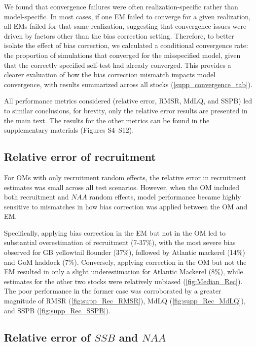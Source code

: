 \documentclass[
  12pt,
]{article}
\begin{document}
We found that convergence failures were often realization-specific
rather than model-specific. In most cases, if one EM failed to converge
for a given realization, all EMs failed for that same realization,
suggesting that convergence issues were driven by factors other than the
bias correction setting. Therefore, to better isolate the effect of bias
correction, we calculated a conditional convergence rate: the proportion
of simulations that converged for the misspecified model, given that the
correctly specified self-test had already converged. This provides a
clearer evaluation of how the bias correction mismatch impacts model
convergence, with results summarized across all stocks
(\autoref{supp_convergence_tab}).

All performance metrics considered (relative error, RMSR, MdLQ, and
SSPB) led to similar conclusions, for brevity, only the relative error
results are presented in the main text. The results for the other
metrics can be found in the supplementary materials (Figures S4--S12).

\hypertarget{relative-error-of-recruitment}{%
\subsection{Relative error of
recruitment}\label{relative-error-of-recruitment}}

For OMs with only recruitment random effects, the relative error in
recruitment estimates was small across all test scenarios. However, when
the OM included both recruitment and \(NAA\) random effects, model
performance became highly sensitive to mismatches in how bias correction
was applied between the OM and EM.

Specifically, applying bias correction in the EM but not in the OM led
to substantial overestimation of recruitment (7-37\%), with the most
severe bias observed for GB yellowtail flounder (37\%), followed by
Atlantic mackerel (14\%) and GoM haddock (7\%). Conversely, applying
correction in the OM but not the EM resulted in only a slight
underestimation for Atlantic Mackerel (8\%), while estimates for the
other two stocks were relatively unbiased (\autoref{fig:Median_Rec}).
The poor performance in the former case was corroborated by a greater
magnitude of RMSR (\autoref{fig:supp_Rec_RMSR}), MdLQ
(\autoref{fig:supp_Rec_MdLQ}), and SSPB (\autoref{fig:supp_Rec_SSPB}).

\hypertarget{relative-error-of-ssb-and-naa}{%
\subsection{\texorpdfstring{Relative error of \(SSB\) and
\(NAA\)}{Relative error of SSB and NAA}}\label{relative-error-of-ssb-and-naa}}
\end{document}
